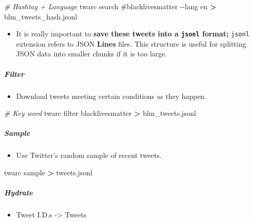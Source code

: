 \documentclass[
]{book}
\newenvironment{Shaded}{\begin{snugshade}}{\end{snugshade}}
\newcommand{\AttributeTok}[1]{\textcolor[rgb]{0.77,0.63,0.00}{#1}}
\newcommand{\CommentTok}[1]{\textcolor[rgb]{0.56,0.35,0.01}{\textit{#1}}}
\newcommand{\ExtensionTok}[1]{#1}
\newcommand{\NormalTok}[1]{#1}
\newcommand{\OperatorTok}[1]{\textcolor[rgb]{0.81,0.36,0.00}{\textbf{#1}}}
\newcommand{\StringTok}[1]{\textcolor[rgb]{0.31,0.60,0.02}{#1}}
\providecommand{\tightlist}{%
  \setlength{\itemsep}{0pt}\setlength{\parskip}{0pt}}
\begin{document}
\begin{Shaded}
\begin{Highlighting}[]
\CommentTok{\# Hashtag + Language }
\ExtensionTok{twarc}\NormalTok{ search }\StringTok{\textquotesingle{}\#blacklivesmatter\textquotesingle{}} \AttributeTok{{-}{-}lang}\NormalTok{ en }\OperatorTok{\textgreater{}}\NormalTok{ blm\_tweets\_hash.jsonl}
\end{Highlighting}
\end{Shaded}

\begin{itemize}
\tightlist
\item
  It is really important to \textbf{save these tweets into a \texttt{jsonl} format;} \texttt{jsonl} extension refers to JSON \textbf{Lines} files. This structure is useful for splitting JSON data into smaller chunks if it is too large.
\end{itemize}

\hypertarget{filter}{%
\subparagraph{Filter}\label{filter}}

\begin{itemize}
\tightlist
\item
  Download tweets meeting certain conditions as they happen.
\end{itemize}

\begin{Shaded}
\begin{Highlighting}[]
\CommentTok{\# Key word}
\ExtensionTok{twarc}\NormalTok{ filter blacklivesmatter }\OperatorTok{\textgreater{}}\NormalTok{ blm\_tweets.jsonl}
\end{Highlighting}
\end{Shaded}

\hypertarget{sample}{%
\subparagraph{Sample}\label{sample}}

\begin{itemize}
\tightlist
\item
  Use Twitter's random sample of recent tweets.
\end{itemize}

\begin{Shaded}
\begin{Highlighting}[]
\ExtensionTok{twarc}\NormalTok{ sample }\OperatorTok{\textgreater{}}\NormalTok{ tweets.jsonl }
\end{Highlighting}
\end{Shaded}

\hypertarget{hydrate}{%
\subparagraph{Hydrate}\label{hydrate}}

\begin{itemize}
\tightlist
\item
  Tweet I.D.s -\textgreater{} Tweets
\end{itemize}
\end{document}
